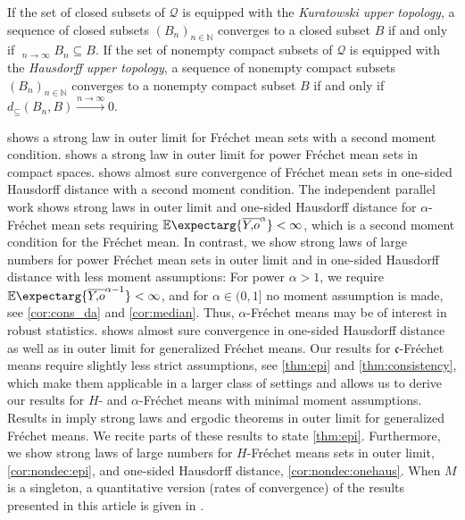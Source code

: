 \documentclass{scrartcl}
\renewcommand{\subset}{\subseteq}
\newcommand{\Ex}{\E\expectarg}
\newcommand*{\mf}[1]{\mathfrak{#1}}
\newcommand{\N}{\mathbb{N}}
\DeclareMathOperator*{\outerlim}{lim\, \overline{sup}}
\def\MS{\mathcal{Q}}\def\epi{\mathsf{epi}}\def\aec{\mathsf{aec}}\def\alsec{\mathsf{alsec}}\def\aecp{\mathsf{aec}_P}\def\Hausdorff{\mathsf{H}}\def\Haus{\mathsf{H}}\def\ubs{\mathsf{ubs}}\newcommand{\epiconv}[1]{\xrightarrow{#1\to\infty}_\epi}\newcommand{\hausconv}[1]{\xrightarrow{#1\to\infty}_\Hausdorff}\newcommand{\ubsconv}[1]{\xrightarrow{#1\to\infty}_\ubs}\newcommand{\ol}[2]{\overline{#1,\!#2}}
\theoremstyle{plain}\newtheorem{theorem}{Theorem}[section]
\theoremstyle{definition}
\theoremstyle{remark}
\begin{document}
If the set of closed subsets of $\MS$ is equipped with the \textit{Kuratowski upper topology}, a sequence of closed subsets $(B_n)_{n\in\N}$ converges to a closed subset $B$ if and only if $\outerlim_{n\to\infty} B_n \subset B$. 
If the set of nonempty compact subsets of $\MS$ is equipped with the \textit{Hausdorff upper topology}, a sequence of nonempty compact subsets $(B_n)_{n\in\N}$ converges to a nonempty compact subset $B$ if and only if $d_{\subset}(B_n, B)\xrightarrow{n\to\infty} 0$. 

\cite{ziezold77} shows a strong law in outer limit for Fréchet mean sets with a second moment condition.
\cite{sverdrup81} shows a strong law in outer limit for power Fréchet mean sets in compact spaces.
\cite{bhattacharya03} shows almost sure convergence of Fréchet mean sets in one-sided Hausdorff distance with a second moment condition.
The independent parallel work \cite{evans20} shows strong laws in outer limit and one-sided Hausdorff distance for $\alpha$-Fréchet mean sets requiring $\Ex{\ol Yo^{\alpha}} < \infty$, which is a second moment condition for the Fréchet mean.
In contrast, we show strong laws of large numbers for power Fréchet mean sets in outer limit and in one-sided Hausdorff distance with less moment assumptions: For power $\alpha>1$, we require $\Ex{\ol Yo^{\alpha-1}} < \infty$, and for $\alpha\in (0,1]$ no moment assumption is made, see \autoref{cor:cons_da} and \autoref{cor:median}. Thus, $\alpha$-Fréchet means may be of interest in robust statistics.
\cite{huckemann11} shows almost sure convergence in one-sided Hausdorff distance as well as in outer limit for generalized Fréchet means. Our results for $\mf c$-Fréchet means require slightly less strict assumptions, see \autoref{thm:epi} and \autoref{thm:consistency}, which make them applicable in a larger class of settings and allows us to derive our results for $H$- and $\alpha$-Fréchet means with minimal moment assumptions.
Results in \cite{artstein95, korf01, choirat03} imply strong laws and ergodic theorems in outer limit for generalized Fréchet means. We recite parts of these results to state \autoref{thm:epi}.
Furthermore, we show strong laws of large numbers for $H$-Fréchet means sets in outer limit, \autoref{cor:nondec:epi}, and one-sided Hausdorff distance, \autoref{cor:nondec:onehaus}.
When $M$ is a singleton, a quantitative version (rates of convergence) of the results presented in this article is given in \cite{schoetz19}.
\end{document}
